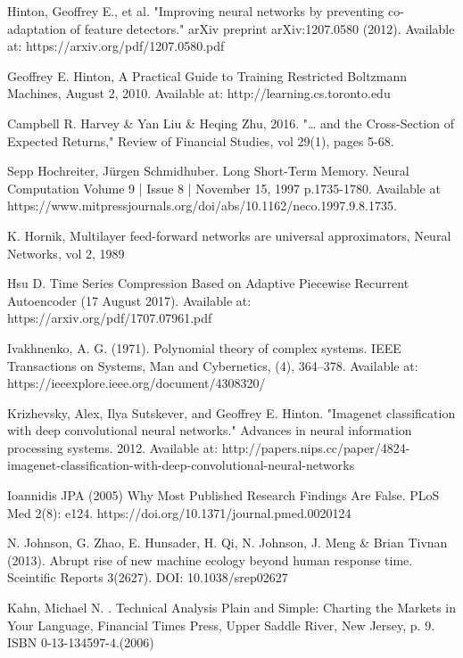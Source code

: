 \documentclass[a4paper,11pt,oneside]{article}
\theoremstyle{plain}
\theoremstyle{definition}
\begin{document}
\begin{thebibliography}{bibliography}
Hinton, Geoffrey E., et al. "Improving neural networks by preventing co-adaptation of feature detectors." arXiv preprint arXiv:1207.0580 (2012).
Available at: https://arxiv.org/pdf/1207.0580.pdf

Geoffrey E. Hinton, A Practical Guide to Training Restricted Boltzmann Machines, August 2, 2010. Available at: http://learning.cs.toronto.edu

Campbell R. Harvey \& Yan Liu \& Heqing Zhu, 2016. "… and the Cross-Section of Expected Returns," Review of Financial Studies, vol 29(1), pages 5-68.

Sepp Hochreiter,  Jürgen Schmidhuber. Long Short-Term Memory. Neural Computation Volume 9 | Issue 8 | November 15, 1997  
p.1735-1780. Available at https://www.mitpressjournals.org/doi/abs/10.1162/neco.1997.9.8.1735.

K. Hornik, Multilayer feed-forward networks are universal approximators, Neural Networks, vol 2, 1989

Hsu D. Time Series Compression Based on Adaptive Piecewise
Recurrent Autoencoder (17 August 2017). Available at: https://arxiv.org/pdf/1707.07961.pdf

Ivakhnenko, A. G. (1971). Polynomial theory of complex systems. IEEE Transactions
on Systems, Man and Cybernetics, (4), 364–378. Available at: https://ieeexplore.ieee.org/document/4308320/

Krizhevsky, Alex, Ilya Sutskever, and Geoffrey E. Hinton. "Imagenet classification with deep convolutional neural networks." Advances in neural information processing systems. 2012.
Available at: http://papers.nips.cc/paper/4824-imagenet-classification-with-deep-convolutional-neural-networks

Ioannidis JPA (2005) Why Most Published Research Findings Are False. PLoS Med 2(8): e124. https://doi.org/10.1371/journal.pmed.0020124

N. Johnson, G. Zhao, E. Hunsader, H. Qi, N. Johnson, J. Meng \& Brian Tivnan (2013). Abrupt rise of new machine ecology beyond human response time. Sceintific Reports 3(2627). DOI: 10.1038/srep02627

Kahn, Michael N. . Technical Analysis Plain and Simple: Charting the Markets in Your Language, Financial Times Press, Upper Saddle River, New Jersey, p. 9. ISBN 0-13-134597-4.(2006)


\end{thebibliography}
\end{document}
